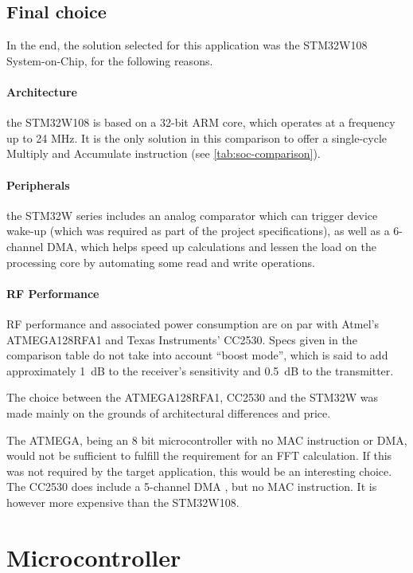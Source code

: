 \subsection{Final choice}

In the end, the solution selected for this application was the STM32W108
System-on-Chip, for the following reasons.

\paragraph{Architecture}

the STM32W108 is based on a 32-bit ARM core, which
operates at a frequency up to 24 MHz. It is the only solution in this comparison
to offer a single-cycle Multiply and Accumulate instruction (see
\autoref{tab:soc-comparison}).

\paragraph{Peripherals} 

the STM32W series includes an analog comparator which
can trigger device wake-up (which was required as part of the project
specifications), as well as a 6-channel \ac{DMA}, which helps speed up
calculations and lessen the load on the processing core by automating some read
and write operations.

\paragraph{RF Performance} 

RF performance and associated power consumption are
on par with Atmel's ATMEGA128RFA1 and Texas Instruments' CC2530. Specs given in
the comparison table do not take into account ``boost mode'', which is said to
add approximately \SI{1}{dB} to the receiver's sensitivity and \SI{0.5}{dB} to
the transmitter.

The choice between the ATMEGA128RFA1, CC2530 and the STM32W was made mainly on
the grounds of architectural differences and price.

The ATMEGA, being an 8 bit microcontroller with no MAC instruction or DMA, would
not be sufficient to fulfill the requirement for an FFT calculation. If this was
not required by the target application, this would be an interesting choice.
The CC2530 does include a 5-channel DMA , but no MAC instruction. It is however
more expensive than the STM32W108. 

\section{Microcontroller}

